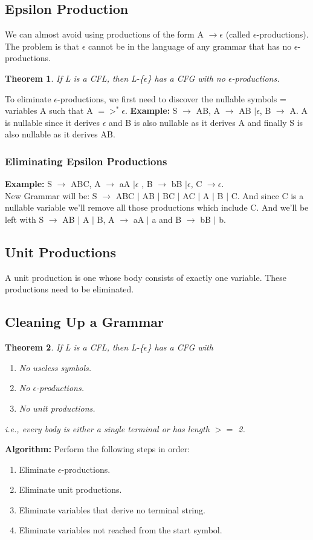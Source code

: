 \documentclass{report}
\newtheorem{theorem}{Theorem}
\begin{document}
\subsection{Epsilon Production}
We can almost avoid using productions of the form A $\rightarrow \epsilon$ (called
$\epsilon$-productions). The problem is that $\epsilon$ cannot be in the language of any grammar that has no $\epsilon$-productions.
\begin{theorem}
If L is a CFL, then L-\{$\epsilon$\} has a CFG with no $\epsilon$-productions.
\end{theorem}
To eliminate $\epsilon$-productions, we first need to discover the nullable symbols = variables A such that A $=>^*\epsilon$. \textbf{Example:} S $\rightarrow$ AB, A $\rightarrow$ AB $| \epsilon$, B $\rightarrow$ A. A is nullable since it derives $\epsilon$ and B is also nullable as it derives A and finally S is also nullable as it derives AB. 
\subsubsection{Eliminating Epsilon Productions}
\textbf{Example:} S $\rightarrow$ ABC, A $\rightarrow$ aA $| \epsilon$ , B $\rightarrow$ bB $| \epsilon$, C $\rightarrow \epsilon$. \\
New Grammar will be: S $\rightarrow$ ABC $|$ AB $|$ BC $|$ AC $|$ A $|$ B $|$ C. 
And since C is a nullable variable we'll remove all those productions which include C. 
And we'll be left with S $\rightarrow$ AB $|$ A $|$ B, A $\rightarrow$ aA $|$ a and B $\rightarrow$ bB $|$ b. 

\subsection{Unit Productions}
A unit production is one whose body consists of exactly one variable. These productions need to be eliminated.
\subsection{Cleaning Up a Grammar}
\begin{theorem}
If L is a CFL, then L-\{$\epsilon$\} has a CFG with 
\begin{enumerate}
    \item No useless symbols.
    \item No $\epsilon$-productions.
    \item No unit productions. 
\end{enumerate}
i.e., every body is either a single terminal or has length $>=$ 2.
\end{theorem}
\textbf{Algorithm:} Perform the following steps in order:
\begin{enumerate}
    \item Eliminate $\epsilon$-productions.
    \item Eliminate unit productions.
    \item Eliminate variables that derive no terminal string.
    \item Eliminate variables not reached from the start symbol.
\end{enumerate}
\end{document}
